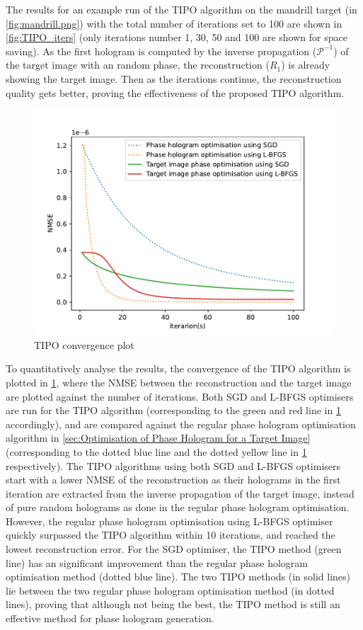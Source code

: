 The results for an example run of the TIPO algorithm on the mandrill target (in \cref{fig:mandrill.png}) with the total number of iterations set to 100 are shown in \cref{fig:TIPO_iters} (only iterations number 1, 30, 50 and 100 are shown for space saving). As the first hologram is computed by the inverse propagation ($\mathcal{P}^{-1}$) of the target image with an random phase, the reconstruction ($R_1$) is already showing the target image. Then as the iterations continue, the reconstruction quality gets better, proving the effectiveness of the proposed TIPO algorithm.

\begin{figure}[H]
	\centering
	\includegraphics[width=\textwidth]{TIPO_convergence.pdf}
	\caption{TIPO convergence plot}
	\label{fig:TIPO_convergence}
\end{figure}

To quantitatively analyse the results, the convergence of the TIPO algorithm is plotted in \cref{fig:TIPO_convergence}, where the NMSE between the reconstruction and the target image are plotted against the number of iterations. Both SGD and L-BFGS optimisers are run for the TIPO algorithm (corresponding to the green and red line in \cref{fig:TIPO_convergence} accordingly), and are compared against the regular phase hologram optimisation algorithm in \cref{sec:Optimisation of Phase Hologram for a Target Image} (corresponding to the dotted blue line and the dotted yellow line in \cref{fig:TIPO_convergence} respectively). The TIPO algorithms using both SGD and L-BFGS optimisers start with a lower NMSE of the reconstruction as their holograms in the first iteration are extracted from the inverse propagation of the target image, instead of pure random holograms as done in the regular phase hologram optimisation. However, the regular phase hologram optimisation using L-BFGS optimiser quickly surpassed the TIPO algorithm within 10 iterations, and reached the lowest reconstruction error. For the SGD optimiser, the TIPO method (green line) has an significant improvement than the regular phase hologram optimisation method (dotted blue line). The two TIPO methods (in solid lines) lie between the two regular phase hologram optimisation method (in dotted lines), proving that although not being the best, the TIPO method is still an effective method for phase hologram generation.